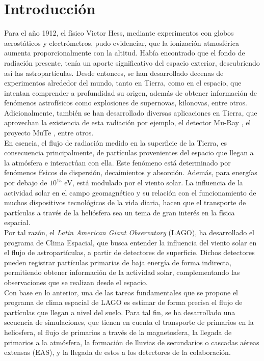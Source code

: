 \newpage
\chapter*{Introducción}
\label{sec:intro}

\noindent Para el año 1912, el físico Victor Hess, mediante experimentos con globos aerostáticos y electrómetros, pudo evidenciar, que la ionización atmosférica aumenta proporcionalmente con la altitud. Había encontrado que el fondo de radiación presente, tenía un aporte significativo del espacio exterior, descubriendo así las astropartículas. Desde entonces, se han desarrollado decenas de experimentos alrededor del mundo, tanto en Tierra, como en el espacio, que intentan comprender a profundidad su origen, además de obtener información de fenómenos astrofísicos como explosiones de supernovas, kilonovas, entre otros. Adicionalmente, también se han desarrollado diversas aplicaciones en Tierra, que aprovechan la existencia de esta radiación por ejemplo, el detector Mu-Ray \citep{Mu-Ray}, el proyecto MuTe \citep{MuTe}, entre otros.\\

En esencia, el flujo de radiación medido en la superficie de la Tierra, es consecuencia principalmente, de partículas provenientes del espacio que llegan a la atmósfera e interactúan con ella. Este fenómeno está determinado por fenómenos físicos de dispersión, decaimientos y absorción. Además, para energías por debajo de $10^{15}$ eV, está modulado por el viento solar. La influencia de la actividad solar en el campo geomagnético y su relación con el funcionamiento de muchos dispositivos tecnológicos de la vida diaria, hacen que el transporte de partículas a través de la heliósfera sea un tema de gran interés en la física espacial. \\

Por tal razón, el \textit{Latin American Giant Observatory} (LAGO), ha desarrollado el programa de Clima Espacial, que busca entender la influencia del viento solar en el flujo de astropartículas, a partir de detectores de superficie. Dichos detectores pueden registrar partículas primarias de baja energía de forma indirecta, permitiendo obtener información de la actividad solar, complementando las observaciones que se realizan desde el espacio.\\

Con base en lo anterior, una de las tareas fundamentales  que se propone el programa de clima espacial de LAGO es estimar de forma precisa el flujo de partículas que llegan a nivel del suelo. Para tal fin, se ha desarrollado una secuencia de simulaciones, que tienen en cuenta el transporte de primarios en la heliosfera, el flujo de primarios a través de la magnetosfera, la llegada de primarios a la atmósfera, la formación de lluvias de secundarios o cascadas aéreas extensas (EAS), y la llegada de estos a los detectores de la colaboración.\\
%

